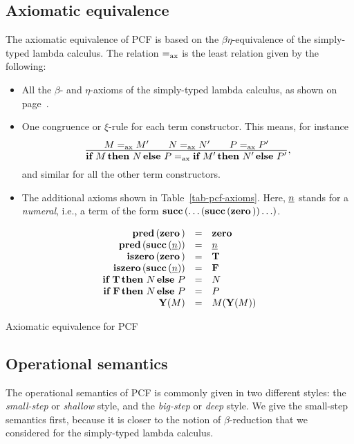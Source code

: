 \documentclass{article}
\begin{document}
\subsection{Axiomatic equivalence}

The axiomatic equivalence of PCF is based on the
$\beta\eta$-equivalence of the simply-typed lambda calculus. The
relation $=_{\rm ax}$ is the least relation given by the following:
\begin{itemize}
\item All the $\beta$- and $\eta$-axioms of the simply-typed lambda
  calculus, as shown on page~\pageref{page-typed-reductions}.
\item One congruence or $\xi$-rule for each term constructor. This
  means, for instance
  \[ \deriv {M\eqax M' \sep N\eqax N' \sep P\eqax P'}
  {\ite{M}{N}{P} \eqax \ite{M'}{N'}{P'}},
  \]
  and similar for all the other term constructors.
\item The additional axioms shown in Table~\ref{tab-pcf-axioms}. Here,
  $\underline{n}$ stands for a {\em numeral}, i.e., a term of the form
  $\mathop{\textbf{\bf succ}\,}(\ldots(\mathop{\textbf{\bf succ}\,}(\mathop{\textbf{\bf zero}\,}))\ldots)$.
\end{itemize}
\begin{table*}[tbp]
\[ \begin{array}{rcl}
  \mathop{\textbf{\bf pred}\,}(\mathop{\textbf{\bf zero}\,}) &=& \mathop{\textbf{\bf zero}\,} \\
  \mathop{\textbf{\bf pred}\,}(\mathop{\textbf{\bf succ}\,}(\underline{n})) &=& \underline{n} \\
  \mathop{\textbf{\bf iszero}\,}(\mathop{\textbf{\bf zero}\,}) &=& {\bf T} \\
  \mathop{\textbf{\bf iszero}\,}(\mathop{\textbf{\bf succ}\,}(\underline{n})) &=& {\bf F} \\
  \mathop{\textbf{\bf if}\,}{\bf T}\mathop{\textbf{\bf then}\,}N\mathop{\textbf{\bf else}\,}P &=& N \\
  \mathop{\textbf{\bf if}\,}{\bf F}\mathop{\textbf{\bf then}\,}N\mathop{\textbf{\bf else}\,}P &=& P \\
  {\bf Y}(M) &=& M({\bf Y}(M))
\end{array}
\]
\caption{Axiomatic equivalence for PCF}
\label{tab-pcf-axioms}
\end{table*}

\subsection{Operational semantics}

The operational semantics of PCF is commonly given in two different
styles: the {\em small-step} or {\em shallow} style, and the {\em
  big-step} or {\em deep} style. We give the small-step semantics
first, because it is closer to the notion of $\beta$-reduction that
we considered for the simply-typed lambda calculus.
\end{document}
